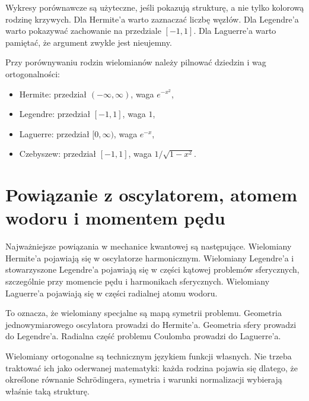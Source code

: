 Wykresy porównawcze są użyteczne, jeśli pokazują strukturę, a nie tylko kolorową rodzinę krzywych. Dla Hermite'a warto zaznaczać liczbę węzłów. Dla Legendre'a warto pokazywać zachowanie na przedziale \([-1,1]\). Dla Laguerre'a warto pamiętać, że argument zwykle jest nieujemny.

Przy porównywaniu rodzin wielomianów należy pilnować dziedzin i wag ortogonalności:
\begin{itemize}
    \item Hermite: przedział \((-\infty,\infty)\), waga \(e^{-x^2}\),
    \item Legendre: przedział \([-1,1]\), waga \(1\),
    \item Laguerre: przedział \([0,\infty)\), waga \(e^{-x}\),
    \item Czebyszew: przedział \([-1,1]\), waga \(1/\sqrt{1-x^2}\).
\end{itemize}

\section{Powiązanie z oscylatorem, atomem wodoru i momentem pędu}

Najważniejsze powiązania w mechanice kwantowej są następujące. Wielomiany Hermite'a pojawiają się w oscylatorze harmonicznym. Wielomiany Legendre'a i stowarzyszone Legendre'a pojawiają się w części kątowej problemów sferycznych, szczególnie przy momencie pędu i harmonikach sferycznych. Wielomiany Laguerre'a pojawiają się w części radialnej atomu wodoru.

To oznacza, że wielomiany specjalne są mapą symetrii problemu. Geometria jednowymiarowego oscylatora prowadzi do Hermite'a. Geometria sfery prowadzi do Legendre'a. Radialna część problemu Coulomba prowadzi do Laguerre'a.

\begin{summarybox}
Wielomiany ortogonalne są technicznym językiem funkcji własnych. Nie trzeba traktować ich jako oderwanej matematyki: każda rodzina pojawia się dlatego, że określone równanie Schrödingera, symetria i warunki normalizacji wybierają właśnie taką strukturę.
\end{summarybox}
